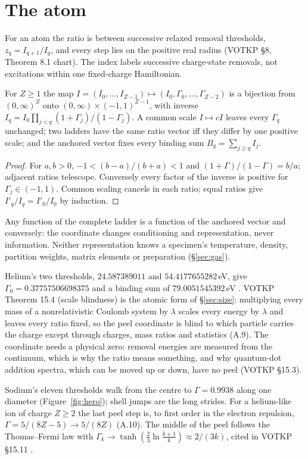 \section{The atom}\label{sec:atom}
For an atom the ratio is between successive relaxed removal thresholds, $z_q=I_{q+1}/I_q$, and every step lies on the positive real radius (VOTKP §8, Theorem 8.1 chart). The index labels successive charge-state removals, not excitations within one fixed-charge Hamiltonian.

\begin{theorem}\label{thm:anchor}
For $Z\ge1$ the map $I=(I_0,\dots,I_{Z-1})\mapsto(I_0,\Gamma_0,\dots,\Gamma_{Z-2})$ is a bijection from $(0,\infty)^Z$ onto $(0,\infty)\times(-1,1)^{Z-1}$, with inverse $I_q=I_0\prod_{j<q}(1+\Gamma_j)/(1-\Gamma_j)$. A common scale $I\mapsto cI$ leaves every $\Gamma_q$ unchanged; two ladders have the same ratio vector iff they differ by one positive scale; and the anchored vector fixes every binding sum $B_q=\sum_{j\ge q}I_j$. 
\end{theorem}
\begin{proof}
For $a,b>0$, $-1<(b-a)/(b+a)<1$ and $(1+\Gamma)/(1-\Gamma)=b/a$; adjacent ratios telescope. Conversely every factor of the inverse is positive for $\Gamma_j\in(-1,1)$. Common scaling cancels in each ratio; equal ratios give $I'_q/I_q=I'_0/I_0$ by induction.
\end{proof}
Any function of the complete ladder is a function of the anchored vector and conversely: the coordinate changes conditioning and representation, never information. Neither representation knows a specimen's temperature, density, partition weights, matrix elements or preparation (§\ref{sec:gas}).

Helium's two thresholds, $24.587389011$ and $54.4177655282$\,eV, give $\Gamma_0=0.37757506698375$ and a binding sum of $79.0051545392$\,eV . VOTKP Theorem 15.4 (scale blindness) is the atomic form of §\ref{sec:size}: multiplying every mass of a nonrelativistic Coulomb system by $\lambda$ scales every energy by $\lambda$ and leaves every ratio fixed, so the peel coordinate is blind to which particle carries the charge except through charges, mass ratios and statistics  (A.9). The coordinate needs a physical zero: removal energies are measured from the continuum, which is why the ratio means something, and why quantum-dot addition spectra, which can be moved up or down, have no peel (VOTKP §15.3).

Sodium's eleven thresholds walk from the centre to $\Gamma=0.9938$ along one diameter (Figure~\ref{fig:hero}); shell jumps are the long strides. For a helium-like ion of charge $Z\ge2$ the last peel step is, to first order in the electron repulsion, $\Gamma=5/(8Z-5)\to5/(8Z)$  (A.10). The middle of the peel follows the Thomas–Fermi law with $\Gamma_k\to\tanh(\tfrac23\ln\tfrac{k+1}{k})\approx2/(3k)$, cited in VOTKP §15.11 .

